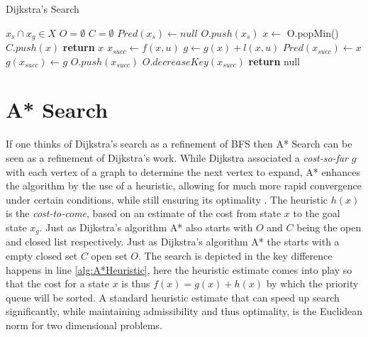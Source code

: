 \begin{algorithm}
    \caption{Dijkstra's Search}\label{alg:Dijkstra}
    \begin{algorithmic}[1]
        \Require $x_s \cap x_g \in X$
        \State $O = \emptyset$
        \State $C = \emptyset$
        \State $Pred(x_s) \gets null$
        \State $O.push(x_s)$
         \label{alg:DijkstraWhile}
            \State $x \gets$ O.popMin()
            \State $C.push(x)$
                \State \textbf{return} $x$ \label{alg:DijkstraSolution}
            \Else
                \State $x_{succ} \gets f(x,u)$
                        \State $g \gets g(x) + l(x,u)$
                            \State $Pred(x_{succ}) \gets x$
                            \State $g(x_{succ}) \gets g$
                                \State $O.push(x_{succ})$
                            \Else
                                \State $O.decreaseKey(x_{succ})$
                            \EndIf
                        \EndIf
                    \EndIf
                \EndFor
            \EndIf
        \EndWhile
        \State \textbf{return} null
    \end{algorithmic}
\end{algorithm}

\section{A* Search}
If one thinks of Dijkstra's search as a refinement of BFS then A* Search can be seen as a refinement of Dijkstra's work. While Dijkstra associated a \textit{cost-so-far} $g$ with each vertex of a graph to determine the next vertex to expand, A* enhances the algorithm by the use of a heuristic, allowing for much more rapid convergence under certain conditions, while still ensuring its optimality \cite{Hart.1968}. The heuristic $h(x)$ is the  \textit{cost-to-come}, based on an estimate of the cost from state $x$ to the goal state $x_g$. Just as Dijkstra's algorithm A* also starts with $O$ and $C$ being the open and closed list respectively. Just as Dijkstra's algorithm A* the starts with a empty closed set $C$ open set $O$. The search is depicted in  the key difference happens in line \ref{alg:A*Heuristic}, here the heuristic estimate comes into play so that the cost for a state $x$ is thus $f(x) = g(x) + h(x)$ by which the priority queue will be sorted. A standard heuristic estimate that can speed up search significantly, while maintaining admissibility and thus optimality, is the Euclidean norm for two dimensional problems.

